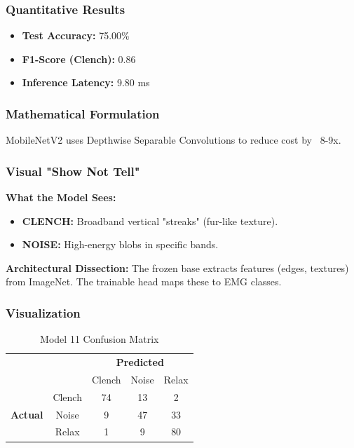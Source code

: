 \documentclass{article}
\begin{document}
\subsubsection{Quantitative Results}
\begin{itemize}
    \item \textbf{Test Accuracy:} 75.00\%
    \item \textbf{F1-Score (Clench):} 0.86
    \item \textbf{Inference Latency:} 9.80 ms
\end{itemize}

\subsubsection{Mathematical Formulation}
MobileNetV2 uses Depthwise Separable Convolutions to reduce cost by ~8-9x.

\subsubsection{Visual "Show Not Tell"}
\textbf{What the Model Sees:}
\begin{itemize}
    \item \textbf{CLENCH:} Broadband vertical "streaks" (fur-like texture).
    \item \textbf{NOISE:} High-energy blobs in specific bands.
\end{itemize}
\textbf{Architectural Dissection:} The frozen base extracts features (edges, textures) from ImageNet. The trainable head maps these to EMG classes.

\subsubsection{Visualization}
    \begin{table}[h]
        \centering
        \begin{tabular}{cc|ccc}
            & & \multicolumn{3}{c}{\textbf{Predicted}} \\
            & & Clench & Noise & Relax \\
            \hline
            \multirow{3}{*}{\textbf{Actual}} & Clench & 74 & 13 & 2 \\
            & Noise & 9 & 47 & 33 \\
            & Relax & 1 & 9 & 80 \\
        \end{tabular}
        \caption{Model 11 Confusion Matrix}
    \end{table}
\end{document}

